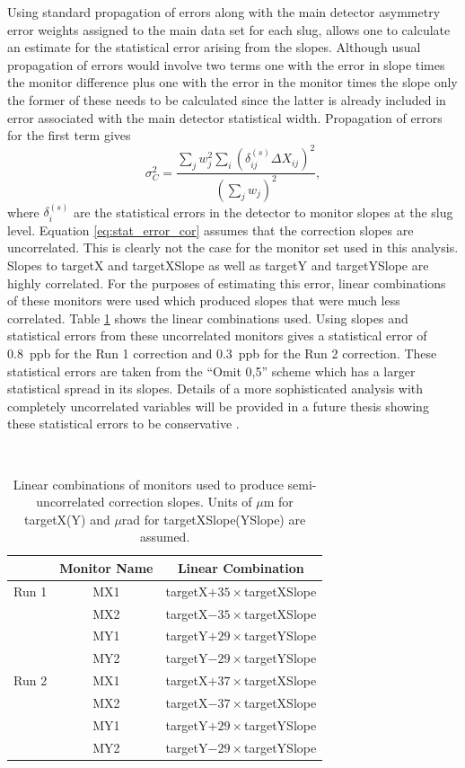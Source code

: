 Using standard propagation of errors along with the main detector asymmetry error weights assigned to the main data set for each slug, allows one to calculate an estimate for the statistical error arising from the slopes. Although usual propagation of errors would involve two terms one with the error in slope times the monitor difference plus one with the error in the monitor times the slope only the former of these needs to be calculated since the latter is already included in error associated with the main detector statistical width. Propagation of errors for the first term gives
\begin{equation}
\label{eq:stat_error_cor}
\sigma_C^2=\frac{\sum_jw_j^2\sum_i\left(\delta_{ij}^{(s)} \Delta X_{ij}\right)^2}{\left(\sum_jw_j\right)^2},
\end{equation}
where $\delta_i^{(s)}$ are the statistical errors in the detector to monitor slopes at the slug level. Equation \ref{eq:stat_error_cor} assumes that the correction slopes are uncorrelated. This is clearly not the case for the monitor set used in this analysis. Slopes to targetX and targetXSlope as well as targetY and targetYSlope are highly correlated. For the purposes of estimating this error, linear combinations of these monitors were used which produced slopes that were much less correlated. Table \ref{tab:uncorrelated_monitors} shows the linear combinations used. Using slopes and statistical errors from these uncorrelated monitors gives a statistical error of 0.8~ppb for the Run 1 correction and 0.3~ppb for the Run 2 correction. These statistical errors are taken from the ``Omit 0,5'' scheme which has a larger statistical spread in its slopes. Details of a more sophisticated analysis with completely uncorrelated variables will be provided in a future thesis showing these statistical errors to be conservative \cite{Peng}.

\begin{table}[h]\
\caption{\label{tab:uncorrelated_monitors} Linear combinations of monitors used to produce semi-uncorrelated correction slopes. Units of $\mu$m for targetX(Y) and $\mu$rad for targetXSlope(YSlope) are assumed.}
\begin{center}
\begin{tabular}{l|c|c}
~&Monitor Name&Linear Combination\\\hline
Run 1 & MX1 & targetX$+35\times$targetXSlope\\
~     & MX2 & targetX$-35\times$targetXSlope\\
~     & MY1 & targetY$+29\times$targetYSlope\\
~     & MY2 & targetY$-29\times$targetYSlope\\\hline
Run 2 & MX1 & targetX$+37\times$targetXSlope\\
~     & MX2 & targetX$-37\times$targetXSlope\\
~     & MY1 & targetY$+29\times$targetYSlope\\
~     & MY2 & targetY$-29\times$targetYSlope\\
\end{tabular}
\end{center}
\end{table}
